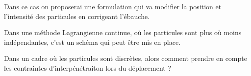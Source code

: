 \documentclass{article}
\begin{document}
Dans ce cas on proposerai une formulation qui va modifier la position et l'intensité des particules en corrigeant l'ébauche.

Dans une méthode Lagrangienne continue, où les particules sont plus où moins indépendantes, c'est un schéma qui peut être mis en place.

Dans un cadre où les particules sont discrètes, alors comment prendre en compte les contraintes d'interpénétraiton lors du déplacement ?


\end{document}
